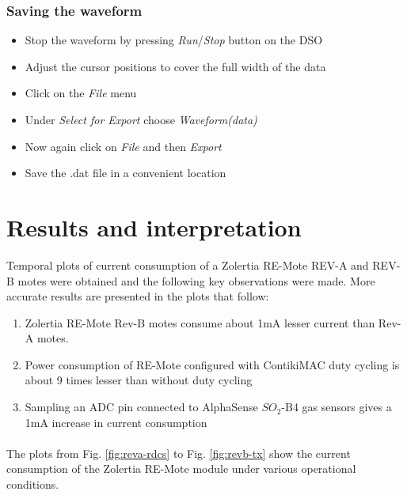 \documentclass[a4paper]{article}
\begin{document}
\subsubsection{Saving the waveform}
\begin{itemize}
	\item{Stop the waveform by pressing \emph{Run}/\emph{Stop} button on the DSO}
    \item{Adjust the cursor positions to cover the full width of the data}
    \item{Click on the \emph{File} menu}
    \item{Under \emph{Select for Export} choose \emph{Waveform(data)}}
    \item{Now again click on \emph{File} and then \emph{Export}}
    \item{Save the .dat file in a convenient location}
\end{itemize}

\section{Results and interpretation}
  Temporal plots of current consumption of a Zolertia RE-Mote REV-A and REV-B motes were obtained and the following key observations were made. More accurate results are presented in the plots that follow:
\begin{enumerate}
    \item{Zolertia RE-Mote Rev-B motes consume about 1mA lesser current than Rev-A motes.}
    \item{Power consumption of RE-Mote configured with ContikiMAC duty cycling is about 9 times lesser than without duty cycling}
    \item{Sampling an ADC pin connected to AlphaSense $SO_2$-B4 gas sensors gives a 1mA increase in current consumption}
\end{enumerate}

\paragraph{}
The plots from Fig. \ref{fig:reva-rdcs} to Fig. \ref{fig:revb-tx} show the current consumption of the Zolertia RE-Mote module under various operational conditions.
\end{document}
